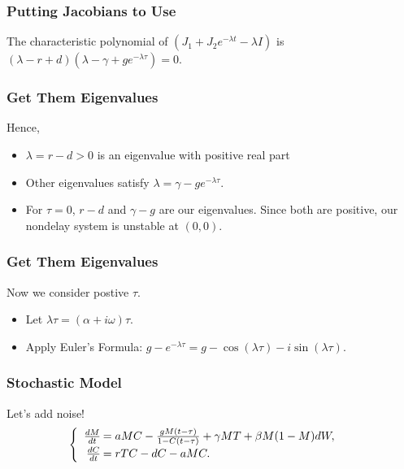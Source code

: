\documentclass{beamer}
\begin{document}
\begin{frame}[c]\frametitle{Putting Jacobians to Use}
The characteristic polynomial of $(J_1+J_2e^{-\lambda t} -\lambda I)$ is $(\lambda - r + d)(\lambda -\gamma + ge^{-\lambda\tau})=0$. 
\end{frame}

\begin{frame}\frametitle{Get Them Eigenvalues}
Hence, \begin{itemize}{\itemsep .5in}\item $\lambda = r-d>0$ is an eigenvalue with positive real part\item Other eigenvalues satisfy $\lambda=\gamma-ge^{-\lambda\tau}$. \item For $\tau=0$, $r-d$ and $\gamma - g$ are our eigenvalues. Since both are positive, our nondelay system is unstable at $(0,0)$. \end{itemize}

\end{frame}

\begin{frame}\frametitle{Get Them Eigenvalues}
Now we consider postive $\tau$.
\begin{itemize}
\item Let $\lambda \tau=(\alpha+i\omega)\tau$.
\item Apply Euler's Formula: $g-e^{-\lambda\tau}=g-\cos(\lambda\tau)-i\sin(\lambda\tau)$.
\end{itemize}
\end{frame}

\begin{frame}
\frametitle{Stochastic Model}
Let's add noise!
$$\begin{cases}
\begin{array}{rl}
\frac{dM}{dt}\hspace{-.8em}&=aMC - \frac{gM(t-\tau)}{1-C(t-\tau)}+\gamma M T+\beta M(1-M)dW,\\
\frac{dC}{dt}\hspace{-.8em}&=rTC - dC - aMC.\\
\end{array}
\end{cases}$$
\end{frame}

\end{document}
